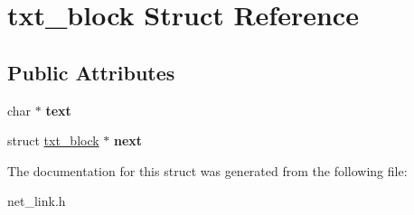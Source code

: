 \hypertarget{structtxt__block}{\section{txt\-\_\-block Struct Reference}
\label{structtxt__block}
}
\subsection*{Public Attributes}
\begin{DoxyCompactItemize}
\item 
\hypertarget{structtxt__block_aa7d2797d5b5246c11007992ece6adc65}{char $\ast$ {\bfseries text}}\label{structtxt__block_aa7d2797d5b5246c11007992ece6adc65}

\item 
\hypertarget{structtxt__block_a38c848381c56d510c724f83ea4909b5f}{struct \hyperlink{structtxt__block}{txt\-\_\-block} $\ast$ {\bfseries next}}\label{structtxt__block_a38c848381c56d510c724f83ea4909b5f}

\end{DoxyCompactItemize}


The documentation for this struct was generated from the following file\-:\begin{DoxyCompactItemize}
\item 
net\-\_\-link.\-h\end{DoxyCompactItemize}
